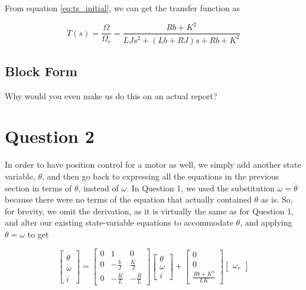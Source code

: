 \documentclass[a4paper, 12pt]{article}
\begin{document}
From equation \eqref{eq:ts_initial}, we can get the transfer function as

\begin{equation}
  T(s) = \frac{\Omega}{\Omega_r} = \frac{Rb + K^2}{LJs^2 + (Lb + RJ)s + Rb + K^2}
  \label{eq:ts_final}
\end{equation}

\subsection{Block Form}

Why would you even make us do this on an actual report?



\section{Question 2}
In order to have position control for a motor as well, we simply add another
state variable, $\theta$, and then go back to expressing all the equations in
the previous section in terms of $\theta$, instead of $\omega$. In Question 1,
we used the substitution $\omega = \dot\theta$ because there were no terms of
the equation that actually contained $\theta$ as is. So, for brevity, we omit
the derivation, as it is virtually the same as for Question 1, and alter our
existing state-variable equations to accommodate $\theta$, and applying
$\dot\theta = \omega$ to get

\begin{equation}
  \left[
  \begin{array}{c}
    \dot \theta \\
    \dot \omega \\
    \dot i
  \end{array}
  \right]
  =
  \left[
  \begin{array}{ccc}
    0 & 1 & 0 \\
    0 & -\frac{b}{J} & \frac{K}{J} \\
    0 & -\frac{K}{L} & -\frac{R}{L}
  \end{array}
  \right]
  \left[
  \begin{array}{c}
    \theta \\
    \omega \\
    i
  \end{array}
  \right]
  +
  \left[
  \begin{array}{c}
    0 \\
    0 \\
    \frac{Rb + K^2}{LK}
  \end{array}
  \right]
  \left[
  \begin{array}{c}
    \omega_r
  \end{array}
  \right]
  \label{eq:ss_position_eq1}
\end{equation}
\end{document}
